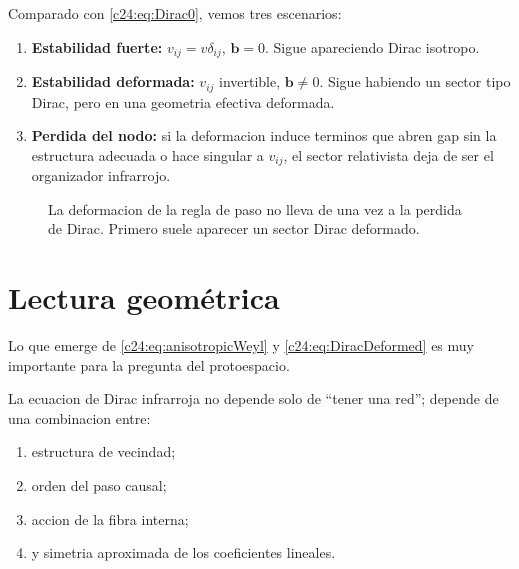 Comparado con \eqref{c24:eq:Dirac0}, vemos tres escenarios:
\begin{enumerate}[label=\arabic*.]
    \item \textbf{Estabilidad fuerte:} \(v_{ij}=v\delta_{ij}\), \(\bm{b}=0\). Sigue apareciendo Dirac isotropo.
    \item \textbf{Estabilidad deformada:} \(v_{ij}\) invertible, \(\bm{b}\neq 0\). Sigue habiendo un sector tipo Dirac, pero en una geometria efectiva deformada.
    \item \textbf{Perdida del nodo:} si la deformacion induce terminos que abren gap sin la estructura adecuada o hace singular a \(v_{ij}\), el sector relativista deja de ser el organizador infrarrojo.
\end{enumerate}

\begin{figure}[h!]
\centering
{}
\caption{La deformacion de la regla de paso no lleva de una vez a la perdida de Dirac. Primero suele aparecer un sector Dirac deformado.}
\end{figure}

\section{Lectura geométrica}
Lo que emerge de \eqref{c24:eq:anisotropicWeyl} y \eqref{c24:eq:DiracDeformed} es muy importante para la pregunta del protoespacio.

La ecuacion de Dirac infrarroja no depende solo de \enquote{tener una red}; depende de una combinacion entre:
\begin{enumerate}[label=\arabic*.]
    \item estructura de vecindad;
    \item orden del paso causal;
    \item accion de la fibra interna;
    \item y simetria aproximada de los coeficientes lineales.
\end{enumerate}


